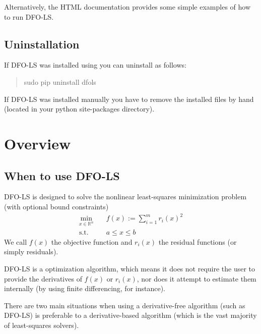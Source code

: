 \documentclass[letterpaper,10pt,english]{sphinxmanual}
\begin{document}
Alternatively, the HTML documentation provides some simple examples of how to run DFO-LS.


\section{Uninstallation}
\label{\detokenize{install:uninstallation}}
If DFO-LS was installed using  you can uninstall as follows:
\begin{quote}

\begin{sphinxVerbatim}[commandchars=\\\{\}]
\PYGZdl{} \PYG{o}{[}sudo\PYG{o}{]} pip uninstall dfols
\end{sphinxVerbatim}
\end{quote}

If DFO-LS was installed manually you have to remove the installed files by hand (located in your python site-packages directory).


\chapter{Overview}
\label{\detokenize{info::doc}}\label{\detokenize{info:overview}}

\section{When to use DFO-LS}
\label{\detokenize{info:when-to-use-dfo-ls}}
DFO-LS is designed to solve the nonlinear least-squares minimization problem (with optional bound constraints)
\begin{equation*}
\begin{split}\min_{x\in\mathbb{R}^n}  &\quad  f(x) := \sum_{i=1}^{m}r_{i}(x)^2 \\
\text{s.t.} &\quad  a \leq x \leq b\end{split}
\end{equation*}
We call \(f(x)\) the objective function and \(r_i(x)\) the residual functions (or simply residuals).

DFO-LS is a  optimization algorithm, which means it does not require the user to provide the derivatives of \(f(x)\) or \(r_i(x)\), nor does it attempt to estimate them internally (by using finite differencing, for instance).

There are two main situations when using a derivative-free algorithm (such as DFO-LS) is preferable to a derivative-based algorithm (which is the vast majority of least-squares solvers).
\end{document}
